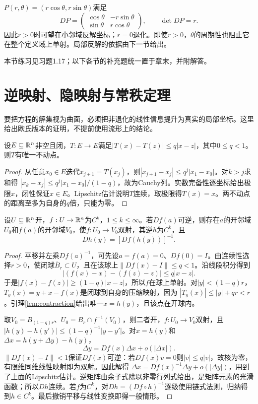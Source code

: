 \begin{example}[极坐标的局部信息]
$P(r,\theta)=(r\cos\theta,r\sin\theta)$满足
\[
 DP=\begin{pmatrix}\cos\theta&-r\sin\theta\\\sin\theta&r\cos\theta\end{pmatrix},
 \qquad \det DP=r.
\]
因此$r>0$时可望在小邻域反解坐标；$r=0$退化。即使$r>0$，$\theta$的周期性也阻止它在整个定义域上单射。局部反解的依据由下一节给出。
\end{example}
本节练习见习题1.17；以下各节的补充题统一置于章末，并附解答。

\section{逆映射、隐映射与常秩定理}
要把方程的解集视为曲面，必须把非退化的线性信息提升为真实的局部坐标。这里给出欧氏版本的证明，不提前使用流形上的结论。
\begin{lemma}[压缩映射原理的欧氏闭集版本]\label{lem:contraction}
设$E\subseteq\mathbb{R}^n$非空且闭，$T:E\to E$满足$|T(x)-T(z)|\leq q|x-z|$，其中$0\leq q<1$。则$T$有唯一不动点。
\end{lemma}
\begin{proof}
从任意$x_0\in E$迭代$x_{j+1}=T(x_j)$，则$|x_{j+1}-x_j|\leq q^j|x_1-x_0|$。对$k>j$求和得
$|x_k-x_j|\leq q^j|x_1-x_0|/(1-q)$，故为Cauchy列。实数完备性逐坐标给出极限$x$，闭性保证$x\in E$。Lipschitz估计说明$T$连续，取极限得$T(x)=x$。两不动点的距离至多为自身的$q$倍，只能为零。
\end{proof}
\begin{theorem}[逆映射定理]\label{thm:inverse}
设$U\subseteq\mathbb{R}^n$开，$f:U\to\mathbb{R}^n$为$C^k$，$1\leq k\leq\infty$。若$Df(a)$可逆，则存在$a$的开邻域$U_0$和$f(a)$的开邻域$V_0$，使$f:U_0\to V_0$双射，其逆$h$为$C^k$，且
\[
 Dh(y)=[Df(h(y))]^{-1}.
\]
\end{theorem}
\begin{proof}
平移并左乘$Df(a)^{-1}$，可先设$a=f(a)=0$、$Df(0)=I$。由连续性选择$r>0$，使闭球$\overline B_r\subset U$，且在该球上$\|Df(x)-I\|\leq q<1$。沿线段积分得到
\[
 |(f(x)-x)-(f(z)-z)|\leq q|x-z|.
\]
于是$|f(x)-f(z)|\geq(1-q)|x-z|$，所以$f$在球上单射。对$|y|<(1-q)r$，$T_y(x)=y+x-f(x)$是闭球到自身的压缩映射，因为
$|T_y(x)|\leq|y|+q r<r$。引理\ref{lem:contraction}给出唯一$x=h(y)$，且该点在开球内。

取$V_0=B_{(1-q)r}$、$U_0=B_r\cap f^{-1}(V_0)$，则二者开，$f:U_0\to V_0$双射，且
$|h(y)-h(y')|\leq(1-q)^{-1}|y-y'|$。对$x=h(y)$和$\Delta x=h(y+\Delta y)-h(y)$，
\[
 \Delta y=Df(x)\Delta x+o(|\Delta x|).
\]
$\|Df(x)-I\|<1$保证$Df(x)$可逆：若$Df(x)v=0$则$|v|\leq q|v|$，故核为零，有限维同维线性映射即为双射。因此解得
$\Delta x=Df(x)^{-1}\Delta y+o(|\Delta y|)$，用到了上面的Lipschitz估计。逆矩阵由余子式除以非零行列式给出，是矩阵元素的光滑函数；所以$Dh$连续。若$f$为$C^k$，对$Dh=(Df\circ h)^{-1}$逐级使用链式法则，归纳得到$h\in C^k$。最后撤销平移与线性变换即得一般情形。
\end{proof}
